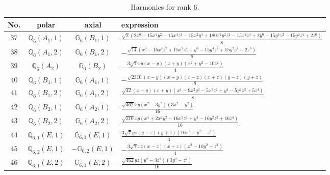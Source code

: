 \documentclass[fleqn,8pt,landscape]{jsarticle}
\begin{document}
\begin{table}[ht!]
\begin{center}
\caption{Harmonics for rank 6.}
\renewcommand{\arraystretch}{1.3}
\begin{tabular}{cccl} \hline \hline
No. & polar & axial & expression \\ \hline
$ 37 $ & $ \mathbb{Q}_{6}(A_{1},1) $ & $ \mathbb{G}_{6}(B_{1},1) $ & $ \frac{\sqrt{2} \left(2 x^{6} - 15 x^{4} y^{2} - 15 x^{4} z^{2} - 15 x^{2} y^{4} + 180 x^{2} y^{2} z^{2} - 15 x^{2} z^{4} + 2 y^{6} - 15 y^{4} z^{2} - 15 y^{2} z^{4} + 2 z^{6}\right)}{8} $ \\
$ 38 $ & $ \mathbb{Q}_{6}(A_{1},2) $ & $ \mathbb{G}_{6}(B_{1},2) $ & $ - \frac{\sqrt{14} \left(x^{6} - 15 x^{4} z^{2} + 15 x^{2} z^{4} + y^{6} - 15 y^{4} z^{2} + 15 y^{2} z^{4} - 2 z^{6}\right)}{8} $ \\
$ 39 $ & $ \mathbb{Q}_{6}(A_{2}) $ & $ \mathbb{G}_{6}(B_{2}) $ & $ - \frac{3 \sqrt{7} x y \left(x - y\right) \left(x + y\right) \left(x^{2} + y^{2} - 10 z^{2}\right)}{4} $ \\
$ 40 $ & $ \mathbb{Q}_{6}(B_{1},1) $ & $ \mathbb{G}_{6}(A_{1},1) $ & $ - \frac{\sqrt{2310} \left(x - y\right) \left(x + y\right) \left(x - z\right) \left(x + z\right) \left(y - z\right) \left(y + z\right)}{8} $ \\
$ 41 $ & $ \mathbb{Q}_{6}(B_{1},2) $ & $ \mathbb{G}_{6}(A_{1},2) $ & $ \frac{\sqrt{42} \left(x - y\right) \left(x + y\right) \left(x^{4} - 9 x^{2} y^{2} - 5 x^{2} z^{2} + y^{4} - 5 y^{2} z^{2} + 5 z^{4}\right)}{8} $ \\
$ 42 $ & $ \mathbb{Q}_{6}(B_{2},1) $ & $ \mathbb{G}_{6}(A_{2},1) $ & $ \frac{\sqrt{462} x y \left(x^{2} - 3 y^{2}\right) \left(3 x^{2} - y^{2}\right)}{16} $ \\
$ 43 $ & $ \mathbb{Q}_{6}(B_{2},2) $ & $ \mathbb{G}_{6}(A_{2},2) $ & $ \frac{\sqrt{210} x y \left(x^{4} + 2 x^{2} y^{2} - 16 x^{2} z^{2} + y^{4} - 16 y^{2} z^{2} + 16 z^{4}\right)}{16} $ \\
$ 44 $ & $ \mathbb{Q}_{6,1}(E,1) $ & $ \mathbb{G}_{6,1}(E,1) $ & $ \frac{3 \sqrt{7} y z \left(y - z\right) \left(y + z\right) \left(10 x^{2} - y^{2} - z^{2}\right)}{4} $ \\
$ 45 $ & $ \mathbb{Q}_{6,2}(E,1) $ & $ -\mathbb{G}_{6,2}(E,1) $ & $ - \frac{3 \sqrt{7} x z \left(x - z\right) \left(x + z\right) \left(x^{2} - 10 y^{2} + z^{2}\right)}{4} $ \\
$ 46 $ & $ \mathbb{Q}_{6,1}(E,2) $ & $ \mathbb{G}_{6,1}(E,2) $ & $ \frac{\sqrt{462} y z \left(y^{2} - 3 z^{2}\right) \left(3 y^{2} - z^{2}\right)}{16} $ \\

\end{tabular}
\end{center}
\end{table}
\end{document}
